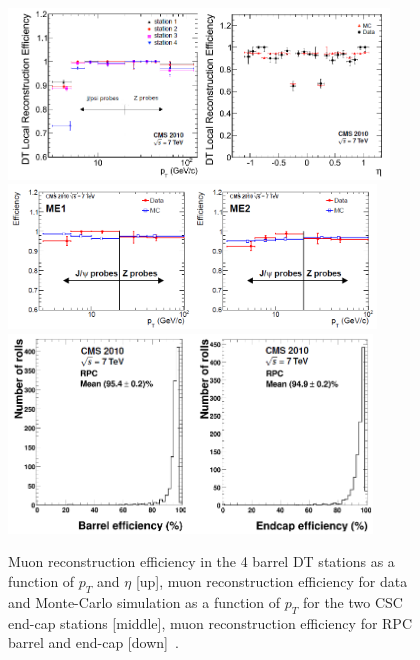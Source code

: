 \begin{figure}[!Hhtbp]
  \begin{center}
    \includegraphics[width=0.9\textwidth, height=0.3\textheight]{figs/DT_Eff.png}
    \includegraphics[width=0.87\textwidth, height=0.3\textheight]{figs/CSC_Eff.png}
    \includegraphics[width=0.86\textwidth, height=0.3\textheight]{figs/RPC_Eff.png}
    \caption{Muon reconstruction efficiency in the 4 barrel DT stations as a function of $p_{T}$ and $\eta$ [up], muon reconstruction efficiency for data and Monte-Carlo simulation as a function of $p_{T}$ for the two CSC end-cap stations [middle], muon reconstruction efficiency for RPC barrel and end-cap [down]~\cite{Chatrchyan:2013sba}.}
    \label{fig:MuonEff}
  \end{center}
\end{figure}

